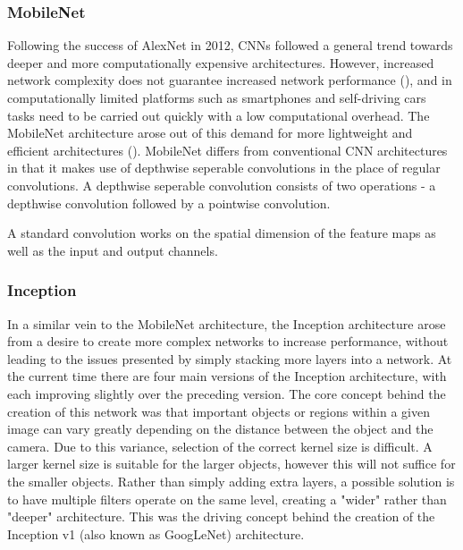 \documentclass[12pt]{report}
\begin{document}
\subsubsection{MobileNet}
\begin{flushleft}
Following the success of AlexNet in 2012, CNNs followed a general trend towards deeper and more computationally expensive architectures. However, increased network complexity does not guarantee increased network performance (\cite{szegedy2016rethinking}), and in computationally limited platforms such as smartphones and self-driving cars tasks need to be carried out quickly with a low computational overhead. The MobileNet architecture arose out of this demand for more lightweight and efficient architectures (\cite{howard2017mobilenets}). MobileNet differs from conventional CNN architectures in that it makes use of depthwise seperable convolutions in the place of regular convolutions. A depthwise seperable convolution consists of two operations - a depthwise convolution followed by a pointwise convolution.

A standard convolution works on the spatial dimension of the feature maps as well as the input and output channels.
\end{flushleft}

\subsubsection{Inception}
\begin{flushleft}
In a similar vein to the MobileNet architecture, the Inception architecture arose from a desire to create more complex networks to increase performance, without leading to the issues presented by simply stacking more layers into a  network. At the current time there are four main versions of the Inception architecture, with each improving slightly over the preceding version. The core concept behind the creation of this network was that important objects or regions within a given image can vary greatly depending on the distance between the object and the camera. Due to this variance, selection of the correct kernel size is difficult. A larger kernel size is suitable for the larger objects, however this will not suffice for the smaller objects. Rather than simply adding extra layers, a possible solution is to have multiple filters operate on the same level, creating a "wider" rather than "deeper" architecture. This was the driving concept behind the creation of the Inception v1 (also known as GoogLeNet) architecture.
\end{flushleft}
\end{document}
